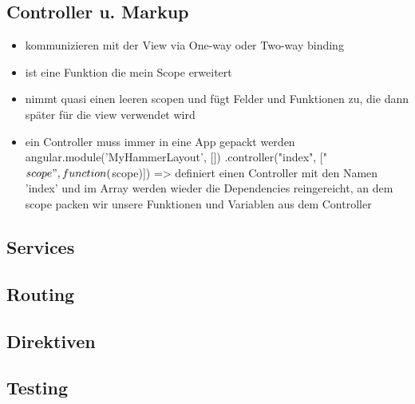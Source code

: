 \subsection{Controller u. Markup}
\begin{itemize}
  \item kommunizieren mit der View via One-way oder Two-way binding
  \item ist eine Funktion die mein Scope erweitert
  \item nimmt quasi einen leeren scopen und fügt Felder und Funktionen zu, die dann später für die view verwendet wird
  \item ein Controller muss immer in eine App gepackt werden
  angular.module('MyHammerLayout', [])
    .controller("index", ["$scope", function($scope)]) => definiert einen Controller mit den Namen 'index' und im Array
    werden wieder die Dependencies reingereicht, an dem scope packen wir unsere Funktionen und Variablen aus dem
    Controller
\end{itemize}


\subsection{Services}

\subsection{Routing}

\subsection{Direktiven}

\subsection{Testing}


